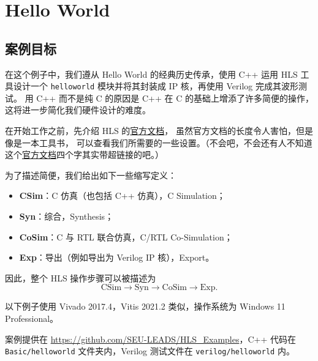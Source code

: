 \documentclass[Chinese,TC,use boldface,simple Names]{beaulivre}
\begin{document}
\chapter{Hello World}

  \section{案例目标}

    在这个例子中，我们遵从 Hello World 的经典历史传承，使用 C++ 运用 HLS 工具设计一个 \texttt{helloworld} 模块并将其封装成 IP 核，再使用 Verilog 完成其波形测试。
    用 C++ 而不是纯 C 的原因是 C++ 在 C 的基础上增添了许多简便的操作，
    这将进一步简化我们硬件设计的难度。

    在开始工作之前，先介绍 HLS 的\href{https://docs.xilinx.com/v/u/2017.4-English/ug902-vivado-high-level-synthesis}{官方文档}，
    虽然官方文档的长度令人害怕，但是像是一本工具书，
    可以查看我们所需要的一些设置。（不会吧，不会还有人不知道这个\href{https://docs.xilinx.com/v/u/2017.4-English/ug902-vivado-high-level-synthesis}{官方文档}四个字其实带超链接的吧。）

    \begin{definition}
      为了描述简便，我们给出如下一些缩写定义：
      \begin{itemize}
        \item {}\textbf{CSim}：C 仿真（也包括 C++ 仿真），C Simulation；
        \item {}\textbf{Syn}：综合，Synthesis；
        \item {}\textbf{CoSim}：C 与 RTL 联合仿真，C/RTL Co-Simulation；
        \item {}\textbf{Exp}：导出（例如导出为 Verilog IP 核），Export。
      \end{itemize}
      因此，整个 HLS 操作步骤可以被描述为
      \[
        \text{CSim}\longrightarrow\text{Syn}\longrightarrow\text{CoSim}\longrightarrow\text{Exp}.
      \]
    \end{definition}

    以下例子使用 Vivado 2017.4，Vitis 2021.2 类似，操作系统为 Windows 11 Professional。

    \begin{tip}
      案例提供在 \url{https://github.com/SEU-LEADS/HLS_Examples}，C++ 代码在 \texttt{Basic/helloworld} 文件夹内，Verilog 测试文件在 \texttt{verilog/helloworld} 内。
      
    \end{tip}
\end{document}
